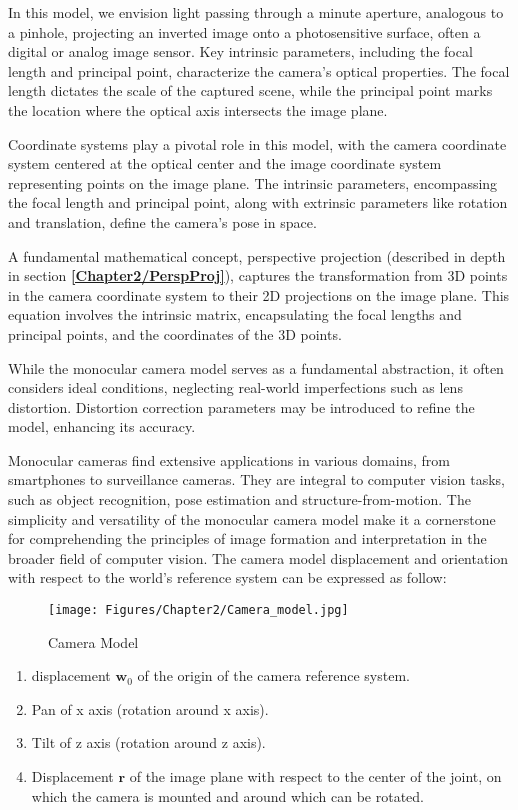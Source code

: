 In this model, we envision light passing through a minute aperture, analogous to a pinhole, projecting an inverted image onto a photosensitive surface, often a digital or analog image sensor. Key intrinsic parameters, including the focal length and principal point, characterize the camera's optical properties. The focal length dictates the scale of the captured scene, while the principal point marks the location where the optical axis intersects the image plane.

Coordinate systems play a pivotal role in this model, with the camera coordinate system centered at the optical center and the image coordinate system representing points on the image plane. The intrinsic parameters, encompassing the focal length and principal point, along with extrinsic parameters like rotation and translation, define the camera's pose in space.

A fundamental mathematical concept, perspective projection (described in depth in section \textbf{\ref{Chapter2/PerspProj}}), captures the transformation from 3D points in the camera coordinate system to their 2D projections on the image plane. This equation involves the intrinsic matrix, encapsulating the focal lengths and principal points, and the coordinates of the 3D points.

While the monocular camera model serves as a fundamental abstraction, it often considers ideal conditions, neglecting real-world imperfections such as lens distortion. Distortion correction parameters may be introduced to refine the model, enhancing its accuracy.

Monocular cameras find extensive applications in various domains, from smartphones to surveillance cameras. They are integral to computer vision tasks, such as object recognition, pose estimation and structure-from-motion. The simplicity and versatility of the monocular camera model make it a cornerstone for comprehending the principles of image formation and interpretation in the broader field of computer vision.
\newpage
The camera model displacement and orientation with respect to the world's reference system can be expressed as follow:

\begin{figure}[th]
    \centering
    \texttt{[image: Figures/Chapter2/Camera\_model.jpg]}
    \caption[Camera Model]{Camera Model}
    \label{fig:CameraModel}
\end{figure}

\begin{enumerate}
    \item displacement $\textbf{w}_0$ of the origin of the camera reference system.
    \item Pan of x axis (rotation around x axis).
    \item Tilt of z axis (rotation around z axis).
    \item Displacement $\textbf{r}$ of the image plane with respect to the center of the joint, on which the camera is mounted and around which can be rotated.
\end{enumerate}

